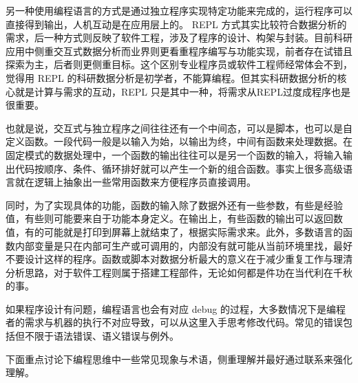 \documentclass[]{tufte-book}
\begin{document}
另一种使用编程语言的方式是通过独立程序实现特定功能来完成的，运行程序可以直接得到输出，人机互动是在应用层上的。 REPL 方式其实比较符合数据分析的需求，后一种方式则反映了软件工程，涉及了程序的设计、构架与封装。目前科研应用中侧重交互式数据分析而业界则更看重程序编写与功能实现，前者存在试错且探索为主，后者则更侧重目标。这个区别专业程序员或软件工程师经常体会不到，觉得用 REPL 的科研数据分析是初学者，不能算编程。但其实科研数据分析的核心就是计算与需求的互动，REPL 只是其中一种，将需求从REPL过度成程序也是很重要。

也就是说，交互式与独立程序之间往往还有一个中间态，可以是脚本，也可以是自定义函数。一段代码一般是以输入为始，以输出为终，中间有函数来处理数据。在固定模式的数据处理中，一个函数的输出往往可以是另一个函数的输入，将输入输出代码按顺序、条件、循环排好就可以产生一个新的组合函数。事实上很多高级语言就在逻辑上抽象出一些常用函数来方便程序员直接调用。

同时，为了实现具体的功能，函数的输入除了数据外还有一些参数，有些是经验值，有些则可能要来自于功能本身定义。在输出上，有些函数的输出可以返回数值，有的可能就是打印到屏幕上就结束了，根据实际需求来。此外，多数语言的函数内部变量是只在内部可生产或可调用的，内部没有就可能从当前环境里找，最好不要设计这样的程序。函数或脚本对数据分析最大的意义在于减少重复工作与理清分析思路，对于软件工程则属于搭建工程部件，无论如何都是件功在当代利在千秋的事。

如果程序设计有问题，编程语言也会有对应 debug 的过程，大多数情况下是编程者的需求与机器的执行不对应导致，可以从这里入手思考修改代码。常见的错误包括但不限于语法错误、语义错误与例外。

下面重点讨论下编程思维中一些常见现象与术语，侧重理解并最好通过联系来强化理解。
\end{document}
